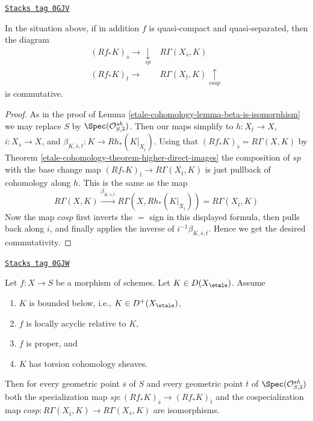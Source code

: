 \begin{lemma}
\label{etale-cohomology-lemma-specialization-cospecialization}
\href{https://stacks.math.columbia.edu/tag/0GJV}{\texttt{Stacks tag 0GJV}}

In the situation above, if in addition
$f$ is quasi-compact and quasi-separated, then the diagram
$$
\begin{array}{cc}(Rf_*K)_{\overline{s}} \longrightarrow\underset{sp}{\downarrow} & R\Gamma(X_{\overline{s}}, K) \\ (Rf_*K)_{\overline{t}} \longrightarrow & R\Gamma(X_{\overline{t}}, K) \underset{cosp}{\uparrow}\end{array}
$$
is commutative.
\end{lemma}

\begin{proof}
As in the proof of Lemma \ref{etale-cohomology-lemma-beta-is-isomorphism}
we may replace $S$ by $\Spec(\mathcal{O}^{sh}_{S, \overline{s}})$.
Then our maps simplify to $h : X_{\overline{t}} \to X$,
$i : X_{\overline{s}} \to X$, and
$\beta_{K, \overline{s}, \overline{t}} : K \to Rh_*(K|_{X_{\overline{t}}})$.
Using that $(Rf_*K)_{\overline{s}} = R\Gamma(X, K)$ by
Theorem \ref{etale-cohomology-theorem-higher-direct-images}
the composition of $sp$ with the base change map
$(Rf_*K)_{\overline{t}} \to R\Gamma(X_{\overline{t}}, K)$
is just pullback of cohomology along $h$.
This is the same as the map
$$
R\Gamma(X, K) \xrightarrow{\beta_{K, \overline{s}, \overline{t}}}
R\Gamma(X, Rh_*(K|_{X_{\overline{t}}})) =
R\Gamma(X_{\overline{t}}, K)
$$
Now the map $cosp$ first inverts the $=$ sign in this displayed
formula, then pulls back along $i$, and finally applies
the inverse of $i^{-1}\beta_{K, \overline{s}, \overline{t}}$.
Hence we get the desired commutativity.
\end{proof}

\begin{lemma}
\label{etale-cohomology-lemma-sp-isom-proper-torsion-loc-ac}
\href{https://stacks.math.columbia.edu/tag/0GJW}{\texttt{Stacks tag 0GJW}}

Let $f : X \to S$ be a morphism of schemes. Let $K \in D(X_\etale)$.
Assume
\begin{enumerate}
\item $K$ is bounded below, i.e., $K \in D^+(X_\etale)$,
\item $f$ is locally acyclic relative to $K$,
\item $f$ is proper, and
\item $K$ has torsion cohomology sheaves.
\end{enumerate}
Then for every geometric point $\overline{s}$ of $S$ and every geometric
point $\overline{t}$ of $\Spec(\mathcal{O}^{sh}_{S, \overline{s}})$
both the specialization map
$sp : (Rf_*K)_{\overline{s}} \to (Rf_*K)_{\overline{t}}$
and the cospecialization map
$cosp : R\Gamma(X_{\overline{t}}, K) \to R\Gamma(X_{\overline{s}}, K)$
are isomorphisms.
\end{lemma}

